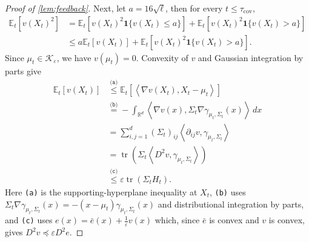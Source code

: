 \documentclass[11pt]{article}
\newcommand{\reason}[1]{\texttt{(#1)}}
\newcommand{\explan}[2]{\stackrel{\reason{#2}}{#1}}
\newcommand{\R}{\mathbb R}
\newcommand{\E}{\mathbb E}
\newcommand{\K}{\mathcal K}
\newcommand{\tr}{\operatorname{tr}}
\newcommand{\1}{\mathbf 1}
\newcommand{\eps}{\varepsilon}
\newcommand{\ip}[2]{\left\langle #1,#2\right\rangle}
\begin{document}
\begin{proof}[Proof of \cref{lem:feedback}]
    Next, let $a=16\sqrt{\ell}$,
    then for every $t\leq\tau_{\mathrm{cov}}$,
    \begin{align}
        \E_t[v(X_t)^2]
         & =
        \E_t\left[
            v(X_t)^2\1\{v(X_t)\leq a\}
            \right]
        +
        \E_t\left[
            v(X_t)^2\1\{v(X_t)>a\}
            \right]
        \nonumber \\
         & \leq
        a\E_t[v(X_t)]
        +
        \E_t\left[
            v(X_t)^2\1\{v(X_t)>a\}
            \right].
        \label{eq:feedback-v2-split}
    \end{align}
    Since $\mu_t\in\K_\eps$, we have $v(\mu_t)=0$.  Convexity of $v$ and
    Gaussian integration by parts give
    \begin{align}
        \E_t[v(X_t)]
         & \explan{\leq}{a}
        \E_t\left[
            \ip{\nabla v(X_t)}{X_t-\mu_t}
            \right]
        \nonumber           \\
         & \explan{=}{b}
        -\int_{\R^d}
        \ip{\nabla v(x)}
        {\Sigma_t\nabla\gamma_{\mu_t,\Sigma_t}(x)}
        \,dx
        \nonumber           \\
         & =
        \sum_{i,j=1}^d
        (\Sigma_t)_{ij}
        \left\langle
        \partial_{ij}v,
        \gamma_{\mu_t,\Sigma_t}
        \right\rangle
        \nonumber           \\
         & =
        \tr\left(
        \Sigma_t
        \left\langle
        D^2v,\gamma_{\mu_t,\Sigma_t}
        \right\rangle
        \right)
        \nonumber           \\
         & \explan{\leq}{c}
        \eps\tr(\Sigma_tH_t).
        \label{eq:feedback-v-first-moment}
    \end{align}
    Here \reason{a} is the supporting-hyperplane inequality at $X_t$,
    \reason{b} uses
    $\Sigma_t\nabla\gamma_{\mu_t,\Sigma_t}(x)
        =-(x-\mu_t)\gamma_{\mu_t,\Sigma_t}(x)$
    and distributional integration by parts, and \reason{c} uses
    $e(x) = \bar{e}(x) + \frac{1}{\eps} v(x)$ which, since $\bar{e}$ is
    convex and $v$ is convex, gives $D^2v \preceq \eps D^2e.$


\end{proof}
\end{document}
